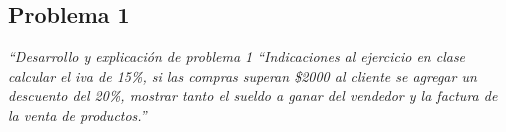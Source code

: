 \subsection{Problema 1}

\textit {“Desarrollo y explicación de problema 1 “Indicaciones al ejercicio en clase calcular el iva de 15\%, si las compras superan \$2000 al cliente se agregar un descuento del 20\%, mostrar tanto el sueldo a ganar del vendedor y la factura de la venta de productos.”}

